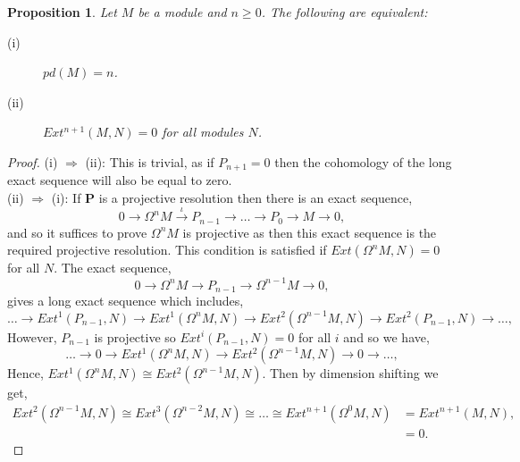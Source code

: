 \documentclass[11.5pt, twoside, a4paper, titlepage]{report}
\theoremstyle{definition}
\theoremstyle{plain}
\newtheorem{prop}[mydef]{Proposition}
\begin{document}
\begin{prop}
Let $M$ be a module and $n\geq0$. The following are equivalent:
\begin{description}
\item [(i)] $pd(M)=n$.
\item [(ii)] $Ext^{n+1}(M,N)=0$ for all modules $N$.
\end{description}
\end{prop}
\begin{proof}
(i) $\Rightarrow$ (ii): This is trivial, as if $P_{n+1}=0$ then the cohomology of the long exact sequence will also be equal to zero.\\
(ii) $\Rightarrow$ (i): If $\mathbf{P}$ is a projective resolution then there is an exact sequence,
\begin{equation*}
0 \xrightarrow{} \Omega^nM \xrightarrow{\iota} P_{n-1} \xrightarrow{} \dots \xrightarrow{} P_0 \xrightarrow{} M \xrightarrow{} 0,
\end{equation*}
and so it suffices to prove $\Omega^nM$ is projective as then this exact sequence is the required projective resolution. This condition is satisfied if $Ext(\Omega^nM,N)=0$ for all $N$. The exact sequence, 
\begin{equation*}
0 \xrightarrow{} \Omega^nM \xrightarrow{} P_{n-1} \xrightarrow{} \Omega^{n-1}M \xrightarrow{} 0,
\end{equation*}
gives a long exact sequence which includes,
\begin{equation*}
\dots \xrightarrow{} Ext^1(P_{n-1},N) \xrightarrow{} Ext^1(\Omega^nM,N) \xrightarrow{} Ext^2(\Omega^{n-1}M,N) \xrightarrow{} Ext^2(P_{n-1},N) \xrightarrow{} \dots,
\end{equation*}
However, $P_{n-1}$ is projective so $Ext^i(P_{n-1},N)=0$ for all $i$ and so we have,
\begin{equation*}
\dots \xrightarrow{} 0 \xrightarrow{} Ext^1(\Omega^nM,N) \xrightarrow{} Ext^2(\Omega^{n-1}M,N) \xrightarrow{} 0 \xrightarrow{} \dots,
\end{equation*}
Hence, $Ext^1(\Omega^nM, N) \cong Ext^2(\Omega^{n-1}M,N)$. Then by dimension shifting we get, 
\begin{align*}
Ext^2(\Omega^{n-1}M,N) \cong Ext^3(\Omega^{n-2}M,N) \cong \dots \cong Ext^{n+1}(\Omega^0M,N)&= Ext^{n+1}(M,N), \\
&=0.
\end{align*}
\end{proof}
\end{document}
